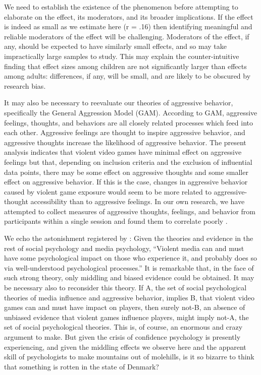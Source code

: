 \documentclass[man]{apa6}
\begin{document}
We need to establish the existence of the phenomenon before attempting to elaborate on the effect, its moderators, and its broader implications. If the effect is indeed as small as we estimate here (r = .16) then identifying meaningful and reliable moderators of the effect will be challenging.  Moderators of the effect, if any, should be expected to have similarly small effects, and so may take impractically large samples to study. This may explain the counter-intuitive finding that effect sizes among children are not significantly larger than effects among adults: differences, if any, will be small, and are likely to be obscured by research bias. 

It may also be necessary to reevaluate our theories of aggressive behavior, specifically the General Aggression Model (GAM). According to GAM, aggressive feelings, thoughts, and behaviors are all closely related processes which feed into each other. Aggressive feelings are thought to inspire aggressive behavior, and aggressive thoughts increase the likelihood of aggressive behavior. The present analysis indicates that violent video games have minimal effect on aggressive feelings \citep[a finding paralleled by][]{Przybylski:etal:2014} but that, depending on inclusion criteria and the exclusion of influential data points, there may be some effect on aggressive thoughts and some smaller effect on aggressive behavior. If this is the case, changes in aggressive behavior caused by violent game exposure would seem to be more related to aggressive-thought accessibility than to aggressive feelings. In our own research, we have attempted to collect measures of aggressive thoughts, feelings, and behavior from participants within a single session and found them to correlate poorly \citep{Engelhardt:etal:2015}.

We echo the astonishment registered by \citet[p. 62]{Warburton:2014}: Given the theories and evidence in the rest of social psychology and media psychology, ``Violent media can and must have some psychological impact on those who experience it, and probably does so via well-understood psychological processes.'' It is remarkable that, in the face of such strong theory, only middling and biased evidence could be obtained. It may be necessary also to reconsider this theory. If A, the set of social psychological theories of media influence and aggressive behavior, implies B, that violent video games can and must have impact on players, then surely not-B, an absence of unbiased evidence that violent games influence players, might imply not-A, the set of social psychological theories. This is, of course, an enormous and crazy argument to make. But given the crisis of confidence psychology is presently experiencing, and given the middling effects we observe here and the apparent skill of psychologists to make mountains out of molehills, is it so bizarre to think that something is rotten in the state of Denmark?
\end{document}
